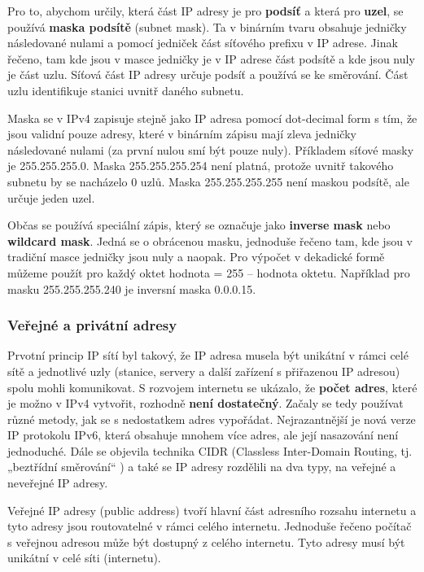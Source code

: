 Pro to, abychom určily, která část IP adresy je pro \textbf{podsíť} a která pro \textbf{uzel}, se používá \textbf{maska podsítě} (subnet mask). Ta v binárním tvaru obsahuje jedničky následované nulami a pomocí jedniček část síťového prefixu v IP adrese. Jinak řečeno, tam kde jsou v masce jedničky je v IP adrese část podsítě a kde jsou nuly je část uzlu. Síťová část IP adresy určuje podsíť a používá se ke směrování. Část uzlu identifikuje stanici uvnitř daného subnetu.

Maska se v IPv4 zapisuje stejně jako IP adresa pomocí dot-decimal form s tím, že jsou validní pouze adresy, které v binárním zápisu mají zleva jedničky následované nulami (za první nulou smí být pouze nuly). Příkladem síťové masky je 255.255.255.0. Maska 255.255.255.254 není platná, protože uvnitř takového subnetu by se nacházelo 0 uzlů. Maska 255.255.255.255 není maskou podsítě, ale určuje jeden uzel.

Občas se používá speciální zápis, který se označuje jako \textbf{inverse mask} nebo \textbf{wildcard mask}. Jedná se o obrácenou masku, jednoduše řečeno tam, kde jsou v tradiční masce jedničky jsou nuly a naopak. Pro výpočet v dekadické formě můžeme použít pro každý oktet hodnota = 255 – hodnota oktetu. Například pro masku 255.255.255.240 je inversní maska 0.0.0.15.

\subsubsection{Veřejné a privátní adresy}
Prvotní princip IP sítí byl takový, že IP adresa musela být unikátní v rámci celé sítě a jednotlivé uzly (stanice, servery a další zařízení s přiřazenou IP adresou) spolu mohli komunikovat. S rozvojem internetu se ukázalo, že \textbf{počet adres}, které je možno v IPv4 vytvořit, rozhodně \textbf{není dostatečný}. Začaly se tedy používat různé metody, jak se  s nedostatkem adres vypořádat. Nejrazantnější je nová verze IP protokolu IPv6, která obsahuje mnohem více adres, ale její nasazování není jednoduché. Dále se objevila technika CIDR (Classless Inter-Domain Routing, tj. „beztřídní směrování“ ) a také se IP adresy rozdělili na dva typy, na veřejné a neveřejné IP adresy.

Veřejné IP adresy (public address) tvoří hlavní část adresního rozsahu internetu a tyto adresy jsou routovatelné v rámci celého internetu. Jednoduše řečeno počítač s veřejnou adresou může být dostupný z celého internetu. Tyto adresy musí být unikátní v celé síti (internetu).

